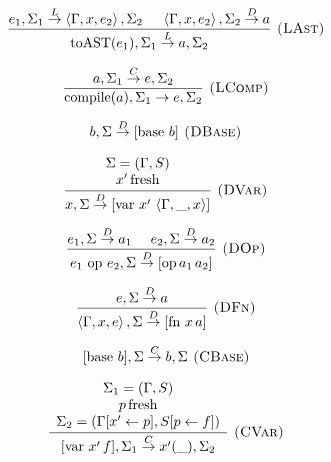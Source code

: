\documentclass[english]{llncs}
\begin{document}
\begin{figure}[!t]
\begin{minipage}[t]{0.59\columnwidth}
{\footnotesize{}
\[
\frac{e_{1},\Sigma_{1}\overset{L}{\rightarrow}\left\langle \Gamma,x,e_{2}\right\rangle ,\Sigma_{2}\,\,\,\,\,\,\,\,\left\langle \Gamma,x,e_{2}\right\rangle ,\Sigma_{2}\overset{D}{\rightarrow}a}{\mbox{toAST(\ensuremath{e_{1}})},\Sigma_{1}\overset{L}{\rightarrow}a,\Sigma_{2}}\textsc{ (LAst)}
\]
}{\footnotesize \par}

{\footnotesize{}
\[
\frac{a,\Sigma_{1}\overset{C}{\rightarrow}e,\Sigma_{2}}{\mbox{compile(\ensuremath{a})},\Sigma_{1}\rightarrow e,\Sigma_{2}}\textsc{ (LComp)}
\]
}%
\end{minipage}{\footnotesize{}}%
\begin{minipage}[t]{0.4\columnwidth}%
{\footnotesize{}
\[
b,\Sigma\overset{D}{\rightarrow}[\mbox{base }b]\textsc{ (DBase)}
\]
}{\footnotesize \par}

{\footnotesize{}
\[
\frac{\begin{array}[t]{c}
\Sigma=(\Gamma,S)\\
x'\,\mbox{fresh}
\end{array}}{x,\Sigma\overset{D}{\rightarrow}[\mbox{var }x'\,\left\langle \Gamma,\_,x\right\rangle ]}\textsc{ (DVar)}
\]
}{\footnotesize \par}

{\footnotesize{}
\[
\frac{e_{1},\Sigma\overset{D}{\rightarrow}a_{1}\,\,\,\,\,\,\,\, e_{2},\Sigma\overset{D}{\rightarrow}a_{2}}{e_{1}\mbox{ op }e_{2},\Sigma\overset{D}{\rightarrow}[\mbox{op\,\ensuremath{a_{1}\,}\ensuremath{a_{2}}}]}\textsc{ (DOp)}
\]
}{\footnotesize \par}

{\footnotesize{}
\[
\frac{e,\Sigma\overset{D}{\rightarrow}a}{\left\langle \Gamma,x,e\right\rangle ,\Sigma\overset{D}{\rightarrow}[\mbox{fn }x\, a]}\textsc{ (DFn)}
\]
}{\footnotesize \par}

{\footnotesize{}
\[
[\mbox{base \ensuremath{b}}],\Sigma\overset{C}{\rightarrow}b,\Sigma\textsc{ (CBase)}
\]
}{\footnotesize \par}

{\footnotesize{}
\[
\frac{\begin{array}[t]{c}
\Sigma_{1}=(\Gamma,S)\\
p\,\mbox{fresh}\\
\Sigma_{2}=(\Gamma[x'\leftarrow p],S[p\leftarrow f])
\end{array}}{[\mbox{var }x'\, f],\Sigma_{1}\overset{C}{\rightarrow}x'(\_),\Sigma_{2}}\textsc{ (CVar)}
\]
}{\footnotesize \par}


\end{minipage}
\end{figure}
\end{document}
